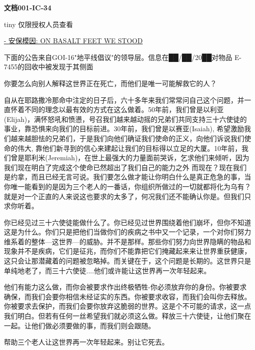 \documentclass[openany,a4paper]{book} %
\begin{document}
\vspace{12pt}

\textbf{文档001-IC-34}

{tiny 仅限授权人员查看}

\begin{colorboxed}
{\color{red}\uline{- 安保模因: ON BASALT FEET WE STOOD}}

下面的公告来自GOI-16"地平线倡议"的领导层。信息在██/██/20██对物品 E-7455的回收中被发现于其侧面\vspace{12pt}

你要怎么向别人解释这世界正在死亡，而他们是唯一可能解救它的人？\vspace{12pt}

自从在耶路撒冷那命中注定的日子后，六十多年来我们常常问自己这个问题，并一直怀着不同的理念以最有效的方式在这么做着。50年前，我们曾是以利亚(Elijah)，满怀怒吼和愤懑，号召我们越来越动摇的兄弟们共同支持三十六使徒的事业，靠恐惧来向我们的目标前进。30年前，我们曾是以赛亚(Isaiah), 希望激励我们越来越胆怯的兄弟们，于是我们向他们确证我们使命的正义，向他们诉说我们使命的伟大, 靠他们新寻到的信心来建起让我们的目标得以立足的大厦。10年前，我们曾是耶利米(Jeremiah)，在世上最强大的力量面前哭诉，乞求他们来倾听，因为我们现在明白了完成这个使命已然超出了我们自己的能力之外
而现在？现在我们是约拿，而且已经无言可说。我们要怎么做才能让你明白什么是真正危急的事，当你唯一能看到的是因为三个老人的一番话，你组织所做过的一切就都将化为乌有？ 就是对一个正直的人来说这也要求的太多了，何况我们还不能确认你是。但我们只求你听着。\vspace{12pt}

你已经见过三十六使徒能做什么了。你已经见过世界围绕着他们崩坏，但你不知道这是为什么。你们只是把他们当做你们的疾病之书中又一个记录，一个对你们努力维系着的整体—这世界—的威胁。并不是那样。那些你们努力向世界隐瞒的物品和现象并不是疾病，它们是征兆，而你们不能靠把它们掩藏起来来让世界重获健康，这只会让那潜藏着的问题被忽略掉。而关键在于，这个问题是长期的。这世界只是单纯地老了，而三十六使徒....他们或许能让这世界再一次年轻起来。\vspace{12pt}

他们有能力这么做，而你会被要求作出终极牺牲-你必须放弃你的身份。你被要求确保，而我们会要你相信未经证实的东西。你被要求收容，而我们会叫你去释放。你被要求去保护，而我们会要你放弃这脆弱的世界。这是个不可能的请求，这一点我们明白。但若有任何一丝希望我们就必须这么做。释放三十六使徒，让他们聚在一起。让他们做必须要做的事，而我们则会跟随。\vspace{12pt}

帮助三个老人让这世界再一次年轻起来。别让它死去。
\end{colorboxed}
\end{document}
